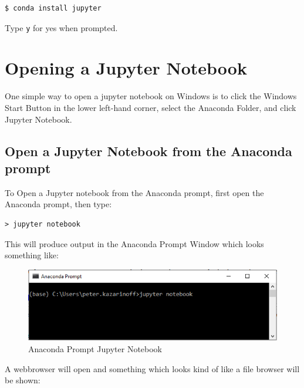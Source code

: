 \documentclass{book}
\makeatletter
\def\maxwidth{\ifdim\Gin@nat@width>\linewidth\linewidth
    \else\Gin@nat@width\fi}
\let\Oldincludegraphics\includegraphics
\renewcommand{\includegraphics}[1]{\Oldincludegraphics[width=.8\maxwidth]{#1}}
\makeatother
\begin{document}
\begin{lstlisting}
$ conda install jupyter
\end{lstlisting}

Type \lstinline!y! for yes when prompted.
    




    
        \section{Opening a Jupyter Notebook}\label{opening-a-jupyter-notebook}
    




    
        One simple way to open a jupyter notebook on Windows is to click the
Windows Start Button in the lower left-hand corner, select the Anaconda
Folder, and click Jupyter Notebook.
    




    
        \subsection{Open a Jupyter Notebook from the Anaconda
prompt}\label{open-a-jupyter-notebook-from-the-anaconda-prompt}
    




    
        To Open a Jupyter notebook from the Anaconda prompt, first open the
Anaconda prompt, then type:

\begin{lstlisting}
> jupyter notebook
\end{lstlisting}

This will produce output in the Anaconda Prompt Window which looks
something like:

\begin{figure}
\centering
\includegraphics{images/Anaconda_Prompt_Jupyter_Notebook.png}
\caption{Anaconda Prompt Jupyter Notebook}
\end{figure}

A webbrowser will open and something which looks kind of like a file
browser will be shown:
\end{document}
